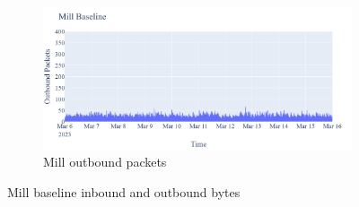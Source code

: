\begin{figure}[H]
\begin{subfigure}[b]{0.4\textwidth}
    \end{subfigure}
    \begin{subfigure}[b]{0.4\textwidth}
        \includegraphics[width=\textwidth]{figures/Mill_Baseline_OutboundPackets.png}
        \caption{Mill outbound packets}
    \end{subfigure}
    \caption{Mill baseline inbound and outbound bytes}
    \label{Fig:MillBaselineOutandInboundTraffic}
 \end{figure}

